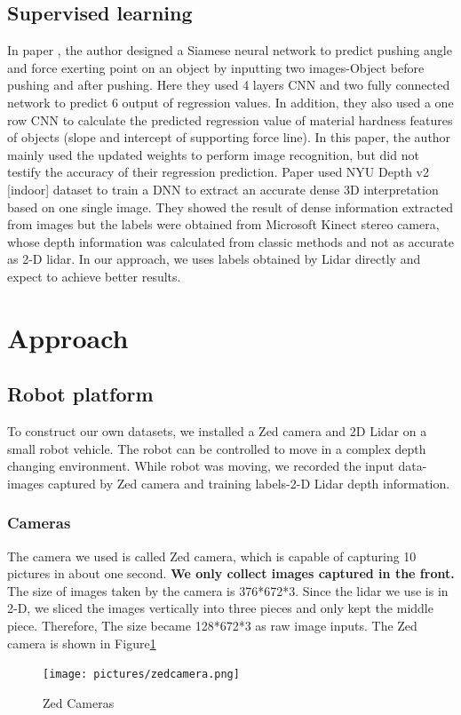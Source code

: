 \documentclass[10pt,twocolumn,letterpaper]{article}
\begin{document}
\subsection{Supervised learning}

In paper \cite{pinto2016curious}, the author designed a Siamese neural network to predict pushing angle and force exerting point on an object by inputting two images-Object before pushing and after pushing. Here they used 4 layers CNN and two fully connected network to predict 6 output of regression values. In addition, they also used a one row CNN to calculate the  predicted regression value of material hardness features of objects (slope and intercept of supporting force line). In this paper, the author mainly used the updated weights to perform image recognition, but did not testify the accuracy of their regression prediction. Paper used NYU Depth v2 [indoor] dataset to train a DNN to extract an accurate dense 3D interpretation based on one single image. They showed the result of dense information extracted from images but the labels were obtained from Microsoft Kinect stereo camera, whose depth information was calculated from classic methods and not as accurate as 2-D lidar. In our approach, we uses labels obtained by Lidar directly and expect to achieve better results. 
\section{Approach}
\subsection{Robot platform}
To construct our own datasets, we installed a Zed camera and 2D Lidar on a small robot vehicle. The robot can be controlled to move in a complex depth changing environment. While robot was moving, we recorded the input data-images captured by Zed camera and training labels-2-D Lidar depth information.
\subsubsection{Cameras}
The camera we used is called Zed camera, which is capable of capturing 10 pictures in about one second. \textbf{We only collect images captured in the front.} The size of images taken by the camera is 376*672*3. Since the lidar we use is in 2-D, we sliced the images vertically into three pieces and only kept the middle piece. Therefore, The size became 128*672*3 as raw image inputs. The Zed camera is shown in Figure\ref{zed_camera}
\begin{figure}[t]
	\begin{center}
		\texttt{[image: pictures/zedcamera.png]}
	\end{center}
	\caption{Zed Cameras}
	\label{zed_camera}
\end{figure}
\end{document}
